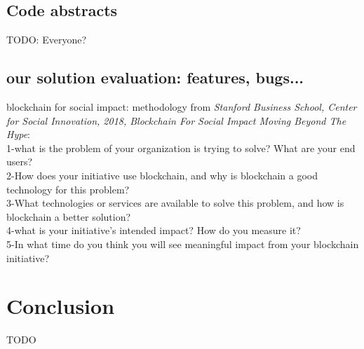 \documentclass[11pt]{article}
\begin{document}
\subsection{Code abstracts}
\color{red} TODO: Everyone? \color{black}

\subsection{our solution evaluation: features, bugs...}
blockchain for social impact: methodology from \textit{Stanford Business School, Center for Social Innovation, 2018, Blockchain For Social Impact Moving Beyond The Hype}:\\
1-what is the problem of your organization is trying to solve? What are your end users?\\
2-How does your initiative use blockchain, and why is blockchain a good technology for this problem?\\
3-What technologies or services are available to solve this problem, and how is blockchain a better solution?\\
4-what is your initiative's intended impact? How do you measure it?\\
5-In what time do you think you will see meaningful impact from your blockchain initiative?\\

\section{Conclusion}
\color{red} TODO \color{black}
\end{document}
